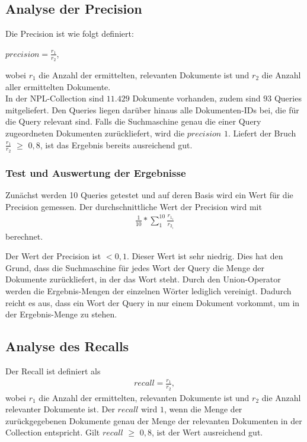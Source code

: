 \subsection{Analyse der Precision}
Die Precision ist wie folgt definiert:
\begin{center}
	$\displaystyle precision = \frac{r_1}{r_2}$,
\end{center}
wobei $r_1$ die Anzahl der ermittelten, relevanten Dokumente ist und $r_2$ die Anzahl aller ermittelten Dokumente.\\
In der NPL-Collection sind $11.429$ Dokumente vorhanden, zudem sind $93$ Queries mitgeliefert. Den Queries liegen darüber hinaus alle Dokumenten-IDs bei, die für die Query relevant sind. Falls die Suchmaschine genau die einer Query zugeordneten Dokumenten zurückliefert, wird die $precision$ $1$.
Liefert der Bruch $\frac{r_1}{r_2}$ $\ge$ $0,8$, ist das Ergebnis bereits ausreichend gut.

\subsubsection{Test und Auswertung der Ergebnisse}
Zunächst werden 10 Queries getestet und auf deren Basis wird ein Wert für die Precision gemessen. 
Der durchschnittliche Wert der Precision wird mit %
\begin{align}
	\frac{1}{10} * \sum_{1}^{10} \frac{r_{1_i}}{r_{2_i}}
\end{align}
berechnet.

Der Wert der Precision ist $< 0,1$. Dieser Wert ist sehr niedrig. Dies hat den Grund, dass die Suchmaschine für jedes Wort der Query die Menge der Dokumente zurückliefert, in der das Wort steht. Durch den Union-Operator werden die Ergebnis-Mengen der einzelnen Wörter lediglich vereinigt. Dadurch reicht es aus, dass ein Wort der Query in nur einem Dokument vorkommt, um in der Ergebnis-Menge zu stehen. 

\subsection{Analyse des Recalls}
Der Recall ist definiert als
\begin{align}
	recall = \frac{r_1}{r_2},
\end{align}
wobei $r_1$ die Anzahl der ermittelten, relevanten Dokumente ist und $r_2$ die Anzahl relevanter Dokumente ist.
Der $recall$ wird $1$, wenn die Menge der zurückgegebenen Dokumente genau der Menge der relevanten Dokumenten in der Collection entspricht.
Gilt $recall$ $\ge$ $0,8$, ist der Wert ausreichend gut.

